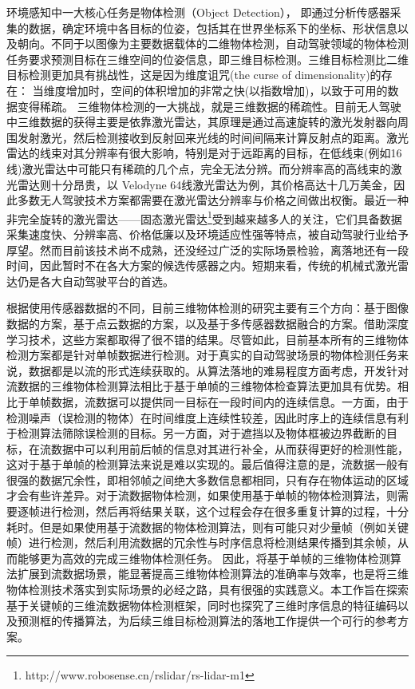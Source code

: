 环境感知中一大核心任务是物体检测（Object Detection）， 即通过分析传感器采集的数据，确定环境中各目标的位姿，包括其在世界坐标系下的坐标、形状信息以及朝向。不同于以图像为主要数据载体的二维物体检测，自动驾驶领域的物体检测任务要求预测目标在三维空间的位姿信息，即三维目标检测。三维目标检测比二维目标检测更加具有挑战性，这是因为维度诅咒(the curse of dimensionality)的存在： 当维度增加时，空间的体积增加的非常之快(以指数增加)，以致于可用的数据变得稀疏。 三维物体检测的一大挑战，就是三维数据的稀疏性。目前无人驾驶中三维数据的获得主要是依靠激光雷达，其原理是通过高速旋转的激光发射器向周围发射激光，然后检测接收到反射回来光线的时间间隔来计算反射点的距离。激光雷达的线束对其分辨率有很大影响，特别是对于远距离的目标，在低线束(例如16线)激光雷达中可能只有稀疏的几个点，完全无法分辨。而分辨率高的高线束的激光雷达则十分昂贵，以 Velodyne 64线激光雷达为例，其价格高达十几万美金，因此多数无人驾驶技术方案都需要在激光雷达分辨率与价格之间做出权衡。最近一种非完全旋转的激光雷达——固态激光雷达\footnote[3]{http://www.robosense.cn/rslidar/rs-lidar-m1}受到越来越多人的关注，它们具备数据采集速度快、分辨率高、价格低廉以及环境适应性强等特点，被自动驾驶行业给予厚望。然而目前该技术尚不成熟，还没经过广泛的实际场景检验，离落地还有一段时间，因此暂时不在各大方案的候选传感器之内。短期来看，传统的机械式激光雷达仍是各大自动驾驶平台的首选。



根据使用传感器数据的不同，目前三维物体检测的研究主要有三个方向：基于图像数据的方案\cite{7780605, chen20183d}，基于点云数据的方案\cite{li20173d,engelcke2017vote3deep,zhou2018voxelnet,simon2018complex,shi2019pointrcnn}，以及基于多传感器数据融合的方案\cite{qi2018frustum,chen2017multi,ku2018joint}。借助深度学习技术，这些方案都取得了很不错的结果。尽管如此，目前基本所有的三维物体检测方案都是针对单帧数据进行检测。对于真实的自动驾驶场景的物体检测任务来说，数据都是以流的形式连续获取的。从算法落地的难易程度方面考虑，开发针对流数据的三维物体检测算法相比于基于单帧的三维物体检查算法更加具有优势。相比于单帧数据，流数据可以提供同一目标在一段时间内的连续信息。一方面，由于检测噪声（误检测的物体）在时间维度上连续性较差，因此时序上的连续信息有利于检测算法筛除误检测的目标。另一方面，对于遮挡以及物体框被边界截断的目标，在流数据中可以利用前后帧的信息对其进行补全，从而获得更好的检测性能，这对于基于单帧的检测算法来说是难以实现的。最后值得注意的是，流数据一般有很强的数据冗余性，即相邻帧之间绝大多数信息都相同，只有存在物体运动的区域才会有些许差异。对于流数据物体检测，如果使用基于单帧的物体检测算法，则需要逐帧进行检测，然后再将结果关联，这个过程会存在很多重复计算的过程，十分耗时。但是如果使用基于流数据的物体检测算法，则有可能只对少量帧（例如关键帧）进行检测，然后利用流数据的冗余性与时序信息将检测结果传播到其余帧，从而能够更为高效的完成三维物体检测任务。 因此，将基于单帧的三维物体检测算法扩展到流数据场景，能显著提高三维物体检测算法的准确率与效率，也是将三维物体检测技术落实到实际场景的必经之路，具有很强的实践意义。本工作旨在探索基于关键帧的三维流数据物体检测框架，同时也探究了三维时序信息的特征编码以及预测框的传播算法，为后续三维目标检测算法的落地工作提供一个可行的参考方案。

